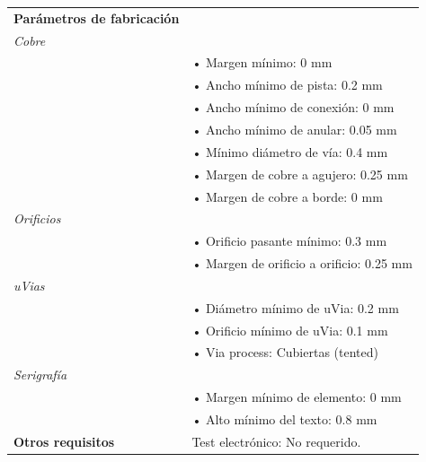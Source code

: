 \documentclass{reporti}
\begin{document}
\begin{table}[H]
\begin{tabularx}{\textwidth}{lX}
    \textbf{Parámetros de fabricación} & \\
    \multicolumn{2}{l}{\textit{Cobre}} \\
    & \quad • Margen mínimo: 0 mm \\
    & \quad • Ancho mínimo de pista: 0.2 mm \\
    & \quad • Ancho mínimo de conexión: 0 mm \\
    & \quad • Ancho mínimo de anular: 0.05 mm \\
    & \quad • Mínimo diámetro de vía: 0.4 mm \\
    & \quad • Margen de cobre a agujero: 0.25 mm \\
    & \quad • Margen de cobre a borde: 0 mm \\
    \multicolumn{2}{l}{\textit{Orificios}} \\
    & \quad • Orificio pasante mínimo: 0.3 mm \\
    & \quad • Margen de orificio a orificio: 0.25 mm \\
    \multicolumn{2}{l}{\textit{uVias}} \\
    & \quad • Diámetro mínimo de uVia: 0.2 mm \\
    & \quad • Orificio mínimo de uVia: 0.1 mm \\
    & \quad • Via process: Cubiertas (tented) \\
    \multicolumn{2}{l}{\textit{Serigrafía}} \\
    & \quad • Margen mínimo de elemento: 0 mm \\
    & \quad • Alto mínimo del texto: 0.8 mm \\
    \cmidrule(lr){1-2}

    \textbf{Otros requisitos} 
    & Test electrónico: No requerido. \\
    \bottomrule
  \end{tabularx}
\end{table}
\end{document}
